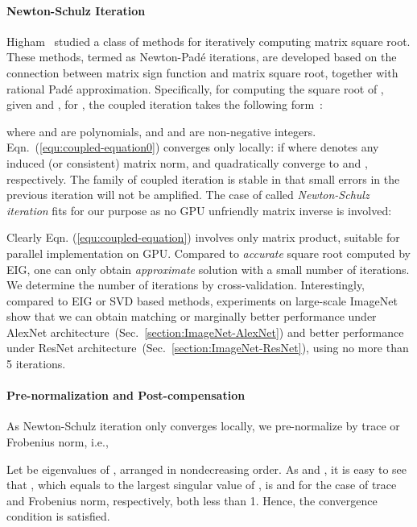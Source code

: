 \documentclass[10pt,twocolumn,letterpaper]{article}
\begin{document}
\vspace{-8pt}\paragraph{Newton-Schulz Iteration}
Higham~\cite{Higham:2008:FM} studied a class of methods for iteratively computing  matrix square root. These methods, termed as  Newton-Pad\'{e} iterations, are developed based on the connection between  matrix sign function and matrix square root, together with  rational Pad\'{e} approximation.  Specifically, for computing the square root  of ,   given  and , for , the coupled iteration  takes the following form~\cite[Chap. 6.7]{Higham:2008:FM}:

where  and  are polynomials, and  and  are non-negative integers. Eqn.~(\ref{equ:coupled-equation0}) converges only locally:  if  where    denotes any induced (or consistent) matrix norm,  and  quadratically converge to  and , respectively. The family of coupled iteration is  stable in that small errors in the previous iteration will not be amplified.  The case of  called \textit{Newton-Schulz iteration}   fits for our purpose as no GPU unfriendly matrix inverse is involved:

Clearly Eqn. (\ref{equ:coupled-equation}) involves only matrix product, suitable for parallel implementation on GPU. Compared to \textit{accurate} square root  computed by EIG, one can only obtain \textit{approximate} solution with a small number of iterations. We determine the  number of iterations   by cross-validation. Interestingly, compared to EIG or SVD based methods, experiments  on large-scale ImageNet show that  we can obtain matching or marginally better performance under AlexNet architecture~(Sec.~\ref{section:ImageNet-AlexNet}) and  better performance under ResNet architecture~(Sec.~\ref{section:ImageNet-ResNet}), using no more than 5 iterations.


\vspace{-8pt}\paragraph{Pre-normalization and Post-compensation} As Newton-Schulz iteration only converges locally, we pre-normalize  by trace or Frobenius norm, i.e.,

Let  be eigenvalues of , arranged in nondecreasing order. As  and , it is easy to see that , which equals to the largest singular value of , is  and  for the case of trace and Frobenius norm, respectively, both  less than 1. Hence, the convergence condition is satisfied. 
\end{document}
